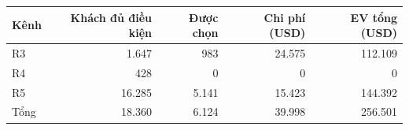 \begin{tabular}{lrrrr}
\toprule
Kênh & Khách đủ điều kiện & Được chọn & Chi phí (USD) & EV tổng (USD) \\
\midrule
R3 & 1.647 & 983 & 24.575 & 112.109 \\
R4 & 428 & 0 & 0 & 0 \\
R5 & 16.285 & 5.141 & 15.423 & 144.392 \\
Tổng & 18.360 & 6.124 & 39.998 & 256.501 \\
\bottomrule
\end{tabular}
